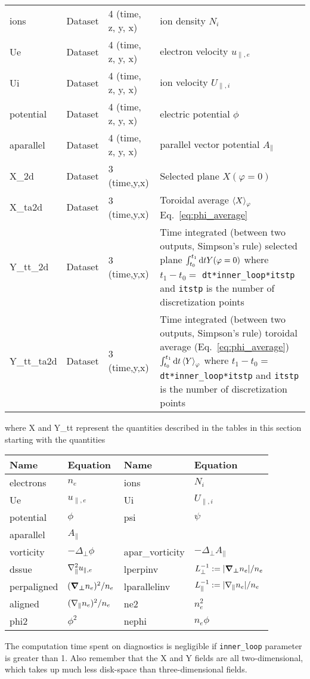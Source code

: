 \begin{longtable}{lll>{\RaggedRight}p{7cm}}
ions             & Dataset & 4 (time, z, y, x) & ion density $N_i$ \\
Ue               & Dataset & 4 (time, z, y, x) & electron velocity $u_{\parallel,e}$ \\
Ui               & Dataset & 4 (time, z, y, x) & ion velocity $U_{\parallel,i}$ \\
potential        & Dataset & 4 (time, z, y, x) & electric potential $\phi$ \\
aparallel        & Dataset & 4 (time, z, y, x) & parallel vector potential $A_\parallel$ \\
X\_2d            & Dataset & 3 (time,y,x) & Selected plane $X(\varphi=0)$ \\
X\_ta2d          & Dataset & 3 (time,y,x) & Toroidal average $\left \langle  X  \right\rangle_\varphi$
Eq.~\eqref{eq:phi_average} \\
Y\_tt\_2d        & Dataset & 3 (time,y,x) & Time integrated (between two outputs, Simpson's rule) selected plane
$\int_{t_0}^{t_1}\mathrm{d} t Y(\varphi=0) $
where $t_1 - t_0 = $ \texttt{\tt dt*inner_loop*itstp} and {\tt itstp} is the number of discretization points\\
Y\_tt\_ta2d      & Dataset & 3 (time,y,x) & Time integrated (between two outputs, Simpson's rule) toroidal average (Eq.~\eqref{eq:phi_average})
$\int_{t_0}^{t_1}\mathrm{d} t \left \langle  Y  \right\rangle_\varphi$
where $t_1 - t_0 = $ \texttt{\tt dt*inner_loop*itstp} and {\tt itstp} is the number of discretization points\\
\bottomrule
\end{longtable}
where
X and Y\_tt represent the quantities described in the tables in this section starting with the quantities
\begin{longtable}{llll}
\toprule
\rowcolor{gray!50}\textbf{Name} &  \textbf{Equation} & \textbf{Name} &  \textbf{Equation}\\
\midrule
    electrons &$n_e$ &
    ions &$N_i$ \\
    Ue &$u_{\parallel,e}$ &
    Ui &$U_{\parallel,i}$ \\
    potential &$\phi$ &
    psi &$\psi$ \\
    aparallel &$A_\parallel$ & \\
    vorticity &$-\Delta_\perp\phi$ &
    apar\_vorticity &$-\Delta_\perp A_\parallel$ \\
    dssue & $\nabla_\parallel^2 u_{\parallel,e}$&
    lperpinv &$L_\perp^{-1} := |{\boldsymbol{{\boldsymbol{\nabla}}_{\perp}}} n_e|/n_e$ \\
    perpaligned &$({\boldsymbol{{\boldsymbol{\nabla}}_{\perp}}} n_e)^2/n_e$ &
    lparallelinv &$L_\parallel^{-1} := |\nabla_\parallel n_e|/n_e$ \\
    aligned &$ (\nabla_\parallel n_e)^2/n_e$ &
    ne2 & $n_e^2$ \\
    phi2 & $\phi^2$ &
    nephi & $n_e\phi$ \\
\bottomrule
\end{longtable}
The computation time spent on diagnostics is negligible if {\tt inner\_loop}
parameter is greater than 1. Also remember that the X and Y fields are all
two-dimensional, which takes up much less disk-space than three-dimensional
fields.

